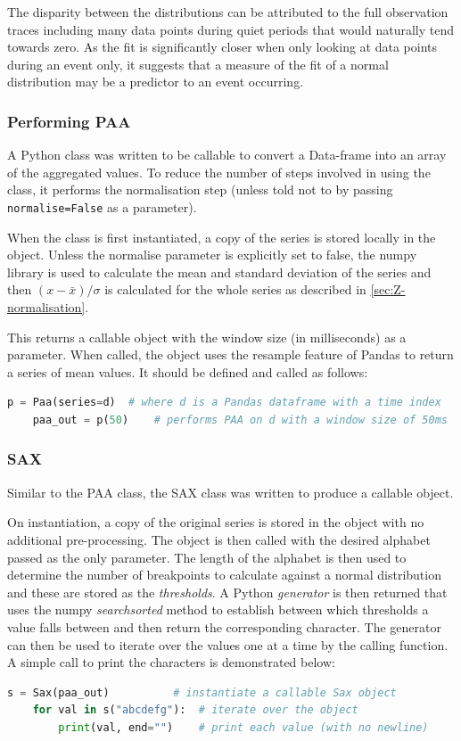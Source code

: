 \documentclass[../report.tex]{subfiles}
\begin{document}
	The disparity between the distributions can be attributed to the full observation traces including many data points during quiet periods that would naturally tend towards zero.  As the fit is significantly closer when only looking at data points during an event only, it suggests that a measure of the fit of a normal distribution may be a predictor to an event occurring.

\subsubsection{Performing PAA}
	A Python class was written to be callable to convert a Data-frame into an array of the aggregated values.  To reduce the number of steps involved in using the class, it performs the normalisation step (unless told not to by passing \texttt{normalise=False} as a parameter).
	
	
	
	When the class is first instantiated, a copy of the series is stored locally in the object.  Unless the normalise parameter is explicitly set to false, the numpy library is used to calculate the mean and standard deviation of the series and then $(x - \bar{x}) / \sigma$ is calculated for the whole series as described in \cref{sec:Z-normalisation}.
	
	This returns a callable object with the window size (in milliseconds) as a parameter.  When called, the object uses the resample feature of Pandas to return a series of mean values.	It should be defined and called as follows:
	
\begin{lstlisting}[language=Python]
	p = Paa(series=d)  # where d is a Pandas dataframe with a time index
	paa_out = p(50)    # performs PAA on d with a window size of 50ms
\end{lstlisting}

\subsubsection{SAX}
	Similar to the PAA class, the SAX class was written to produce a callable object.

	
	
	On instantiation, a copy of the original series is stored in the object with no additional pre-processing.  The object is then called with the desired alphabet passed as the only parameter.  The length of the alphabet is then used to determine the number of breakpoints to calculate against a normal distribution and these are stored as the \textit{thresholds}.  A Python \textit{generator} is then returned that uses the numpy \textit{searchsorted} method to establish between which thresholds a value falls between and then return the corresponding character.  The generator can then be used to iterate over the values one at a time by the calling function.  A simple call to print the characters is demonstrated below:
	
\begin{lstlisting}[language=Python]
	s = Sax(paa_out)          # instantiate a callable Sax object
	for val in s("abcdefg"):  # iterate over the object
	    print(val, end="")    # print each value (with no newline)
\end{lstlisting}
	
\end{document}
